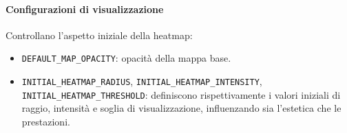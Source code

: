 \paragraph{Configurazioni di visualizzazione}
Controllano l'aspetto iniziale della heatmap:
\begin{itemize}
  \item \texttt{DEFAULT\_MAP\_OPACITY}: opacità della mappa base.

  \item \texttt{INITIAL\_HEATMAP\_RADIUS}, \texttt{INITIAL\_HEATMAP\_INTENSITY},
    \texttt{INITIAL\_HEATMAP\_THRESHOLD}: definiscono rispettivamente i valori iniziali
    di raggio, intensità e soglia di visualizzazione, influenzando sia l'estetica
    che le prestazioni.
\end{itemize}